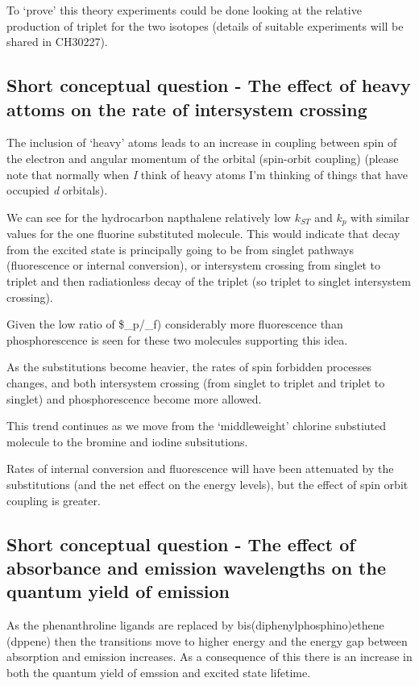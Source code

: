 \documentclass[
]{book}
\begin{document}
To `prove' this theory experiments could be done looking at the relative production of triplet for the two isotopes (details of suitable experiments will be shared in CH30227).

\hypertarget{sec:heavyans}{%
\subsection{Short conceptual question - The effect of heavy attoms on the rate of intersystem crossing}\label{sec:heavyans}}

The inclusion of `heavy' atoms leads to an increase in coupling between spin of the electron and angular momentum of the orbital (spin-orbit coupling) (please note that normally when \emph{I} think of heavy atoms I'm thinking of things that have occupied \emph{d} orbitals).

We can see for the hydrocarbon napthalene relatively low \(k_{ST}\) and \(k_{p}\) with similar values for the one fluorine substituted molecule. This would indicate that decay from the excited state is principally going to be from singlet pathways (fluorescence or internal conversion), or intersystem crossing from singlet to triplet and then radiationless decay of the triplet (so triplet to singlet intersystem crossing).

Given the low ratio of \$\phi\_p/\phi\_f) considerably more fluorescence than phosphorescence is seen for these two molecules supporting this idea.

As the substitutions become heavier, the rates of spin forbidden processes changes, and both intersystem crossing (from singlet to triplet and triplet to singlet) and phosphorescence become more allowed.

This trend continues as we move from the `middleweight' chlorine substiuted molecule to the bromine and iodine subsitutions.

Rates of internal conversion and fluorescence will have been attenuated by the substitutions (and the net effect on the energy levels), but the effect of spin orbit coupling is greater.

\hypertarget{sec:osphenans}{%
\subsection{Short conceptual question - The effect of absorbance and emission wavelengths on the quantum yield of emission}\label{sec:osphenans}}

As the phenanthroline ligands are replaced by bis(diphenylphosphino)ethene (dppene) then the transitions move to higher energy and the energy gap between absorption and emission increases. As a consequence of this there is an increase in both the quantum yield of emssion and excited state lifetime.
\end{document}
